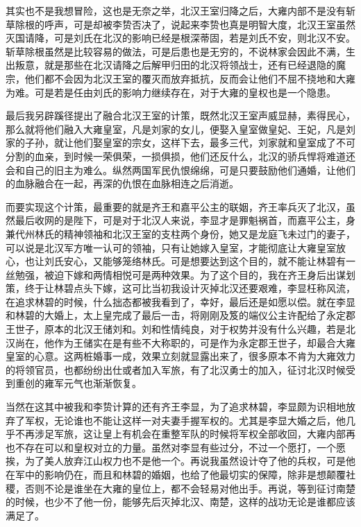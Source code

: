 其实也不是我想冒险，这也是无奈之举，北汉王室归降之后，大雍内部不是没有斩草除根的呼声，可是却被李贽否决了，说起来李贽也真是明智大度，北汉王室虽然灭国请降，可是刘氏在北汉的影响已经是根深蒂固，若是刘氏不安，则北汉不安。斩草除根虽然是比较容易的做法，可是后患也是无穷的，不说林家会因此不满，生出叛意，就是那些在北汉请降之后解甲归田的北汉将领战士，还有已经退隐的魔宗，他们都不会因为北汉王室的覆灭而放弃抵抗，反而会让他们不屈不挠地和大雍为难。可是若是任由刘氏的影响力继续存在，对于大雍的皇权也是一个隐患。

最后我另辟蹊径提出了融合北汉王室的计策，既然北汉王室声威显赫，素得民心，那么就将他们融入大雍皇室，凡是刘家的女儿，便娶入皇室做皇妃、王妃，凡是刘家的子孙，就让他们娶皇室的宗女，这样下去，最多三代，刘家就和皇室成了不可分割的血亲，到时候一荣俱荣，一损俱损，他们还反什么，北汉的骄兵悍将难道还会和自己的旧主为难么。纵然两国军民仇恨绵绵，可是只要鼓励他们通婚，让他们的血脉融合在一起，再深的仇恨在血脉相连之后消逝。

而要实现这个计策，最重要的就是齐王和嘉平公主的联姻，齐王率兵灭了北汉，虽然最后收网的是陛下，可是对于北汉人来说，李显才是罪魁祸首，而嘉平公主，身兼代州林氏的精神领袖和北汉王室的支柱两个身份，她又是龙庭飞未过门的妻子，可以说是北汉军方唯一认可的领袖，只有让她嫁入皇室，才能彻底让大雍皇室放心，也让刘氏安心，又能够笼络林氏。可是想要达到这个目的，就不能让林碧有一丝勉强，被迫下嫁和两情相悦可是两种效果。为了这个目的，我在齐王身后出谋划策，终于让林碧点头下嫁，这可比当初我设计灭掉北汉还要艰难，李显枉称风流，在追求林碧的时候，什么拙态都被我看到了，幸好，最后还是如愿以偿。就在李显和林碧的大婚上，太上皇完成了最后一击，将刚刚及笈的端仪公主许配给了永定郡王世子，原本的北汉王储刘和。刘和性情纯良，对于权势并没有什么兴趣，若是北汉尚在，他作为王储实在是有些不大称职的，可是作为永定郡王世子，却最合大雍皇室的心意。这两桩婚事一成，效果立刻就显露出来了，很多原本不肯为大雍效力的将领官员，也都纷纷出仕或者加入军旅，有了北汉勇士的加入，征讨北汉时候受到重创的雍军元气也渐渐恢复。

当然在这其中被我和李贽计算的还有齐王李显，为了追求林碧，李显颇为识相地放弃了军权，无论谁也不能让这样一对夫妻手握军权的。尤其是李显大婚之后，他几乎不再涉足军旅，这让皇上有机会在重整军队的时候将军权全部收回，大雍内部再也不存在可以和皇权对立的力量。虽然对李显有些过分，不过一个愿打，一个愿挨，为了美人放弃江山权力也不是他一个。再说我虽然设计夺了他的兵权，可是他在军中的影响仍在，而且和林碧的婚姻，也给了他最切实的保障，除非是想颠覆社稷，否则不论是谁坐在大雍的皇位上，都不会轻易对他出手。再说，等到征讨南楚的时候，也少不了他一份，能够先后灭掉北汉、南楚，这样的战功无论是谁都应该满足了。


